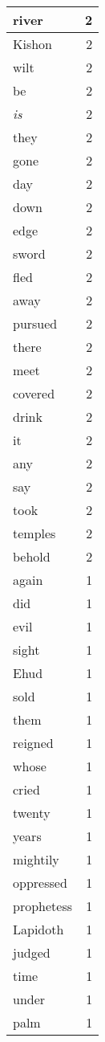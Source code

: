 \begin{center}
\begin{longtable}{l|r}
river & 2\\ \hline 
Kishon & 2\\ \hline 
wilt & 2\\ \hline 
be & 2\\ \hline 
\emph{is} & 2\\ \hline 
they & 2\\ \hline 
gone & 2\\ \hline 
day & 2\\ \hline 
down & 2\\ \hline 
edge & 2\\ \hline 
sword & 2\\ \hline 
fled & 2\\ \hline 
away & 2\\ \hline 
pursued & 2\\ \hline 
there & 2\\ \hline 
meet & 2\\ \hline 
covered & 2\\ \hline 
drink & 2\\ \hline 
it & 2\\ \hline 
any & 2\\ \hline 
say & 2\\ \hline 
took & 2\\ \hline 
temples & 2\\ \hline 
behold & 2\\ \hline 
again & 1\\ \hline 
did & 1\\ \hline 
evil & 1\\ \hline 
sight & 1\\ \hline 
Ehud & 1\\ \hline 
sold & 1\\ \hline 
them & 1\\ \hline 
reigned & 1\\ \hline 
whose & 1\\ \hline 
cried & 1\\ \hline 
twenty & 1\\ \hline 
years & 1\\ \hline 
mightily & 1\\ \hline 
oppressed & 1\\ \hline 
prophetess & 1\\ \hline 
Lapidoth & 1\\ \hline 
judged & 1\\ \hline 
time & 1\\ \hline 
under & 1\\ \hline 
palm & 1\\ \hline 

\end{longtable}
\end{center}
